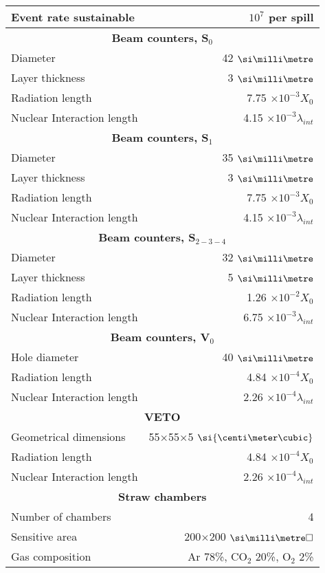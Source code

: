 \begin{longtable}{|l|r|}
  Event rate sustainable & $10^{7}$ per spill \\
  \hline
  \multicolumn{2}{|c|}{\textbf{Beam counters, S$_{0}$}}\\
  \hline
  Diameter & 42 $\mmi$ \\
  Layer thickness & 3 $\mmi$ \\
  Radiation length & 7.75 $\times10^{-3} X_0$ \\
  Nuclear Interaction length & 4.15 $\times 10^{-3} \lambda_{int}$ \\
  \hline
  \multicolumn{2}{|c|}{\textbf{Beam counters, S$_{1}$}}\\
  \hline
  Diameter & 35 $\mmi$ \\
  Layer thickness & 3 $\mmi$ \\
  Radiation length & 7.75 $\times10^{-3} X_0$ \\
  Nuclear Interaction length & 4.15 $\times 10^{-3} \lambda_{int}$ \\
  \hline
  \multicolumn{2}{|c|}{\textbf{Beam counters, S$_{2-3-4}$}}\\
  \hline
  Diameter & 32 $\mmi$ \\
  Layer thickness & 5 $\mmi$ \\
  Radiation length & 1.26 $\times10^{-2} X_0$ \\
  Nuclear Interaction length & 6.75 $\times 10^{-3} \lambda_{int}$ \\
  \hline
  \multicolumn{2}{|c|}{\textbf{Beam counters, V$_0$}}\\
  \hline
  Hole diameter & 40 $\mmi$ \\
  Radiation length & 4.84 $\times10^{-4} X_0$ \\
  Nuclear Interaction length & 2.26 $\times 10^{-4} \lambda_{int}$ \\
  \hline
  \multicolumn{2}{|c|}{\textbf{VETO}}\\
  \hline
  Geometrical dimensions & 55$\times$55$\times$5 $\si{\centi\meter\cubic}$ \\
  Radiation length & 4.84 $\times10^{-4} X_0$ \\
  Nuclear Interaction length & 2.26 $\times 10^{-4} \lambda_{int}$ \\
  \hline
  \multicolumn{2}{|c|}{\textbf{Straw chambers}}\\
  \hline
  Number of chambers & 4 \\
  Sensitive area & 200$\times$200 $\mms$ \\
  Gas composition & Ar 78\%, CO$_2$ 20\%, O$_2$ 2\% \\

\end{longtable}
